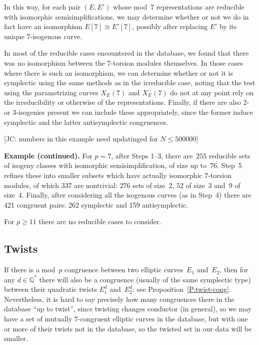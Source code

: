 \documentclass[12pt, reqno]{amsart}
\newcommand{\Q}{\mathbb{Q}}
\numberwithin{equation}{section}
\theoremstyle{definition}
\theoremstyle{remark}
\newcommand{\jc}[1]{{\color{darkgreen} \textsf{[JC: #1]}}}
\begin{document}

In this way, for each pair $(E,E')$ whose 
mod~$7$ representations
are reducible with isomorphic semisimplifications, we may determine
whether or not we do in fact have an isomorphism $E[7]\cong E'[7]$,
possibly after replacing $E'$ by its unique $7$-isogenous curve.

In most of the reducible cases encountered in the database, we found
that there was no isomorphism between the $7$-torsion modules
themselves.  In those cases where there is such an isomorphism, we can
determine whether or not it is symplectic using the same methods as in
the irreducible case, noting that the test using the parametrizing
curves $X_E(7)$ and $X_E^-(7)$ do not at any point rely on the
irreducibility or otherwise of the representations.  Finally, if there
are also $2$-{} or $3$-isogenies present we can include these
appropriately, since the former induce symplectic and the latter
antisymplectic congruences.

\jc{numbers in this example need updatinged for $N\le500000$}

{\bf Example (continued).} For $p=7$, after Steps 1--3, there
are~$255$ reducible sets of isogeny classes with isomorphic
semisimplification, of size up to~$76$.  Step~5 refines these into
smaller subsets which have actually isomorphic $7$-torsion modules, of
which $337$ are nontrivial: $276$ sets of size~$2$, $52$ of size~$3$
and~$9$ of size~$4$.  Finally, after considering all the isogenous
curves (as in Step~4) there are 421 congruent pairs: 262 symplectic
and 159 antisymplectic.

For $p\ge11$ there are no reducible cases to consider.

\subsection{Twists}
If there is a mod~$p$ congruence between two elliptic curves~$E_1$
and~$E_2$, then for any $d\in\Q^*$ there will also be a congruence
(usually of the same symplectic type) between their quadratic twists
$E_1^d$ and~$E_2^d$: see Proposition~\ref{P:twist-cong}.
Nevertheless, it is hard to say precisely how many congruences there
in the database ``up to twist'', since twisting changes conductor (in
general), so we may have a set of mutually $7$-congruent elliptic
curves in the database, but with one or more of their twists not in
the database, so the twisted set in our data will be smaller.
\end{document}
